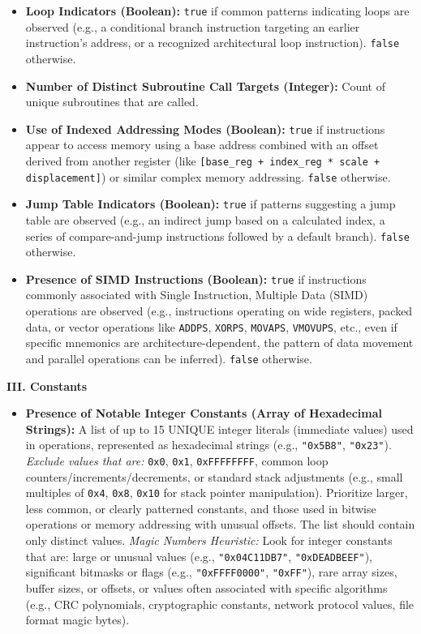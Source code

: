 \begin{tcolorbox}
\begin{itemize}[noitemsep, topsep=1pt]
    \item \textbf{Loop Indicators (Boolean):} \texttt{true} if common patterns indicating loops are observed (e.g., a conditional branch instruction targeting an earlier instruction's address, or a recognized architectural loop instruction). \texttt{false} otherwise.
    \item \textbf{Number of Distinct Subroutine Call Targets (Integer):} Count of unique subroutines that are called.
    \item \textbf{Use of Indexed Addressing Modes (Boolean):} \texttt{true} if instructions appear to access memory using a base address combined with an offset derived from another register (like \texttt{[base\_reg + index\_reg * scale + displacement]}) or similar complex memory addressing. \texttt{false} otherwise.
    \item \textbf{Jump Table Indicators (Boolean):} \texttt{true} if patterns suggesting a jump table are observed (e.g., an indirect jump based on a calculated index, a series of compare-and-jump instructions followed by a default branch). \texttt{false} otherwise.
    \item \textbf{Presence of SIMD Instructions (Boolean):} \texttt{true} if instructions commonly associated with Single Instruction, Multiple Data (SIMD) operations are observed (e.g., instructions operating on wide registers, packed data, or vector operations like \texttt{ADDPS}, \texttt{XORPS}, \texttt{MOVAPS}, \texttt{VMOVUPS}, etc., even if specific mnemonics are architecture-dependent, the pattern of data movement and parallel operations can be inferred). \texttt{false} otherwise.
    \end{itemize}
    \textbf{III. Constants}
    \begin{itemize}[noitemsep, topsep=1pt]
    \item \textbf{Presence of Notable Integer Constants (Array of Hexadecimal Strings):} A list of up to 15 UNIQUE integer literals (immediate values) used in operations, represented as hexadecimal strings (e.g., \texttt{"0x5B8"}, \texttt{"0x23"}). \textit{Exclude values that are:} \texttt{0x0}, \texttt{0x1}, \texttt{0xFFFFFFFF}, common loop counters/increments/decrements, or standard stack adjustments (e.g., small multiples of \texttt{0x4}, \texttt{0x8}, \texttt{0x10} for stack pointer manipulation). Prioritize larger, less common, or clearly patterned constants, and those used in bitwise operations or memory addressing with unusual offsets. The list should contain only distinct values.
    \textit{Magic Numbers Heuristic:} Look for integer constants that are: large or unusual values (e.g., \texttt{"0x04C11DB7"}, \texttt{"0xDEADBEEF"}), significant bitmasks or flags (e.g., \texttt{"0xFFFF0000"}, \texttt{"0xFF"}), rare array sizes, buffer sizes, or offsets, or values often associated with specific algorithms (e.g., CRC polynomials, cryptographic constants, network protocol values, file format magic bytes).

\end{itemize}
\end{tcolorbox}
